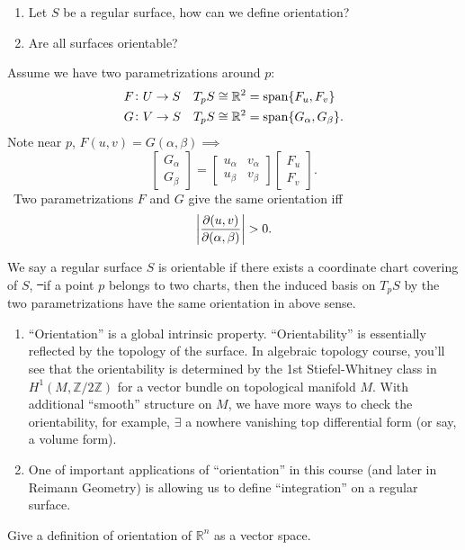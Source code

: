 \begin{question}\hfill
\begin{enumerate}[(1)]
    \item Let \(S\) be a regular surface, how can we define orientation?
    \item Are all surfaces orientable?
\end{enumerate}
\end{question}

Assume we have two parametrizations around \(p\):
\begin{align*}
    F&\colon U\to S &&T_p S\cong \mathbb{R}^2=\operatorname{span}\{F_u,F_v\} \\
    G&\colon V\to S &&T_p S\cong \mathbb{R}^2=\operatorname{span}\{G_\alpha,G_\beta\}
.\end{align*}
Note near \(p\), \(F(u,v)=G(\alpha,\beta)\implies \) \[
    \begin{bmatrix}
        G_\alpha \\ G_\beta
    \end{bmatrix}=\begin{bmatrix}
        u_\alpha & v_\alpha \\
        u_\beta & v_\beta
    \end{bmatrix}\begin{bmatrix}
        F_u \\ F_v
    \end{bmatrix}
.\] 
\ie\ Two parametrizations \(F\) and \(G\) give the same orientation iff \[
    \left|\pdv{(u,v)}{(\alpha,\beta)}\right|>0
.\] 

\begin{definition}
    We say a regular surface \(S\) is orientable if there exists a coordinate
    chart covering of \(S\), \st\ if a point \(p\) belongs to two charts, then the
    induced basis on \(T_p S\) by the two parametrizations have the same orientation
    in above sense.
\end{definition}

\begin{remark}\hfill
\begin{enumerate}[(1)]
    \item ``Orientation'' is a global intrinsic property. ``Orientability'' is
    essentially reflected by the topology of the surface. In algebraic topology
    course, you'll see that the orientability is determined by the 1st
    Stiefel-Whitney class in \(H^1(M,\mathbb{Z}/2\mathbb{Z})\) for a vector
    bundle on topological manifold \(M\).
    With additional ``smooth'' structure on \(M\), we have more ways to check
    the orientability, for example, \(\exists\) a nowhere vanishing top
    differential form (or say, a volume form).
    \item One of important applications of ``orientation'' in this course (and
    later in Reimann Geometry) is allowing us to define ``integration'' on a regular
    surface.
\end{enumerate}
\end{remark}

\begin{exercise}
    Give a definition of orientation of \(\mathbb{R}^n\) as a vector space.
\end{exercise}
